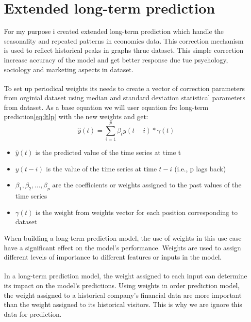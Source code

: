     \section{Extended long-term prediction} \label{sec:extlonglp}
    For my purpose i created extended long-term prediction which handle the seasonality and repeated patterns in economics data.
    This correction mechanism is used to reflect historical peaks in graphs thrue dataset. This simple correction increase accuracy of the
    model and get better response due tue psychology, sociology and marketing aspects in dataset.\\
    \\
    To set up periodical weights its needs to create a vector of correction parameters from orginial dataset using median and standard deviation
    statistical parameters from dataset.
    As a base equation we will user equation fro long-term prediction\ref{eq:ltlp} with the new weights and get:
    \begin{equation} \label{eq:eltlp}
        \hat{y}(t) = \sum_{i=1}^{p} \beta_i y(t-i) * \gamma(t)
    \end{equation}
    \begin{itemize}
        \item $\hat{y}(t)$ is the predicted value of the time series at time t
        \item $y(t-i)$ is the value of the time series at time $t-i$ (i.e., p lags back)
        \item $\beta_1, \beta_2, \dots, \beta_p$ are the coefficients or weights assigned to the past values of the time series
        \item $\gamma(t)$ is the weight from weights vector for each position corresponding to dataset
    \end{itemize}
    When building a long-term prediction model, the use of weights in this use case have a significant effect on the model's performance.
    Weights are used to assign different levels of importance to different features or inputs in the model.\\
    \\
    In a long-term prediction model, the weight assigned to each input can determine its impact on the model's predictions.
    Using weights in order prediction model, the weight assigned to a historical company's financial data are more important
    than the weight assigned to its historical visitors. This is why we are ignore this data for prediction.\\
    \\
